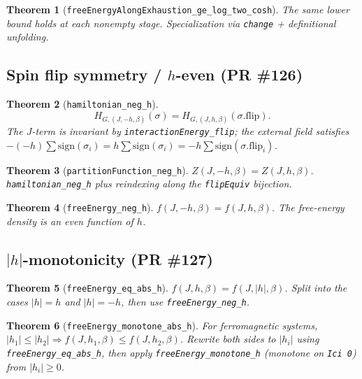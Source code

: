 \documentclass[a4paper,11pt]{article}
\newtheorem{theorem}{Theorem}
\begin{document}
\begin{theorem}[\texttt{freeEnergyAlongExhaustion\_ge\_log\_two\_cosh}]
The same lower bound holds at each nonempty stage.
Specialization via \texttt{change} + definitional unfolding.
\end{theorem}

\subsection{Spin flip symmetry / \texorpdfstring{$h$}{h}-even (PR \#126)}

\begin{theorem}[\texttt{hamiltonian\_neg\_h}]
\[
  H_{G, (J, -h, \beta)}(\sigma)
    = H_{G, (J, h, \beta)}(\sigma.\text{flip}).
\]
The $J$-term is invariant by \texttt{interactionEnergy\_flip}; the external
field satisfies
$-(-h) \sum \text{sign}(\sigma_i) = h \sum \text{sign}(\sigma_i)
  = -h \sum \text{sign}(\sigma.\text{flip}_i)$.
\end{theorem}

\begin{theorem}[\texttt{partitionFunction\_neg\_h}]
$Z(J, -h, \beta) = Z(J, h, \beta)$.
\texttt{hamiltonian\_neg\_h} plus reindexing along the \texttt{flipEquiv}
bijection.
\end{theorem}

\begin{theorem}[\texttt{freeEnergy\_neg\_h}]
$f(J, -h, \beta) = f(J, h, \beta)$.
The free-energy density is an even function of $h$.
\end{theorem}

\subsection{\texorpdfstring{$|h|$}{|h|}-monotonicity (PR \#127)}

\begin{theorem}[\texttt{freeEnergy\_eq\_abs\_h}]
$f(J, h, \beta) = f(J, |h|, \beta)$.
Split into the cases $|h| = h$ and $|h| = -h$, then use
\texttt{freeEnergy\_neg\_h}.
\end{theorem}

\begin{theorem}[\texttt{freeEnergy\_monotone\_abs\_h}]
For ferromagnetic systems,
$|h_1| \le |h_2| \Rightarrow f(J, h_1, \beta) \le f(J, h_2, \beta)$.
Rewrite both sides to $|h_i|$ using \texttt{freeEnergy\_eq\_abs\_h}, then
apply \texttt{freeEnergy\_monotone\_h} (monotone on \texttt{Ici 0}) from
$|h_i| \ge 0$.
\end{theorem}
\end{document}
